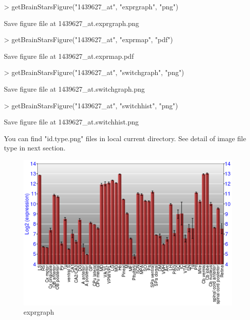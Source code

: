 \documentclass[12pt,fullpage]{article}
\begin{document}
\begin{Schunk}
\begin{Sinput}
> getBrainStarsFigure("1439627_at", "exprgraph", "png")
\end{Sinput}
\begin{Soutput}
Save figure file at 1439627_at.exprgraph.png 
\end{Soutput}
\begin{Sinput}
> getBrainStarsFigure("1439627_at", "exprmap", "pdf")
\end{Sinput}
\begin{Soutput}
Save figure file at 1439627_at.exprmap.pdf 
\end{Soutput}
\begin{Sinput}
> getBrainStarsFigure("1439627_at", "switchgraph", "png")
\end{Sinput}
\begin{Soutput}
Save figure file at 1439627_at.switchgraph.png 
\end{Soutput}
\begin{Sinput}
> getBrainStarsFigure("1439627_at", "switchhist", "png")
\end{Sinput}
\begin{Soutput}
Save figure file at 1439627_at.switchhist.png 
\end{Soutput}
\end{Schunk}

You can find "id.type.png" files in local current directory. See detail of image file type in next section.

\begin{figure}
  \centering
  \includegraphics{exprgraph.png}
  \caption{exprgraph}
\end{figure}
\end{document}
